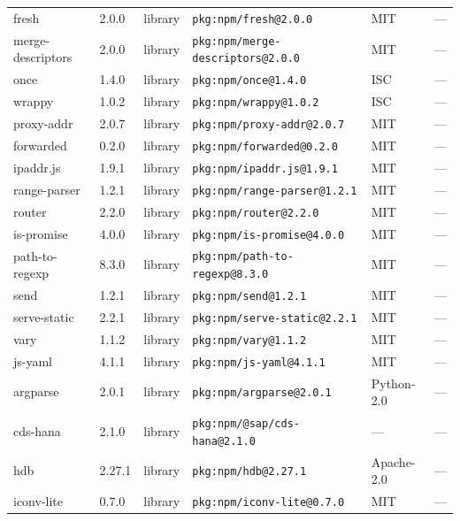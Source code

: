 \documentclass[11pt,a4paper]{article}
\begin{document}
\begin{longtable}{|p{4cm}|p{2cm}|p{1.6cm}|p{5cm}|p{1.5cm}|p{3.5cm}|}
\raggedright fresh & 2.0.0 & library & \small\texttt{pkg:npm/fresh@2.0.0} & MIT & \small — \\
\raggedright merge-descriptors & 2.0.0 & library & \small\texttt{pkg:npm/merge-descriptors@2.0.0} & MIT & \small — \\
\raggedright once & 1.4.0 & library & \small\texttt{pkg:npm/once@1.4.0} & ISC & \small — \\
\raggedright wrappy & 1.0.2 & library & \small\texttt{pkg:npm/wrappy@1.0.2} & ISC & \small — \\
\raggedright proxy-addr & 2.0.7 & library & \small\texttt{pkg:npm/proxy-addr@2.0.7} & MIT & \small — \\
\raggedright forwarded & 0.2.0 & library & \small\texttt{pkg:npm/forwarded@0.2.0} & MIT & \small — \\
\raggedright ipaddr.js & 1.9.1 & library & \small\texttt{pkg:npm/ipaddr.js@1.9.1} & MIT & \small — \\
\raggedright range-parser & 1.2.1 & library & \small\texttt{pkg:npm/range-parser@1.2.1} & MIT & \small — \\
\raggedright router & 2.2.0 & library & \small\texttt{pkg:npm/router@2.2.0} & MIT & \small — \\
\raggedright is-promise & 4.0.0 & library & \small\texttt{pkg:npm/is-promise@4.0.0} & MIT & \small — \\
\raggedright path-to-regexp & 8.3.0 & library & \small\texttt{pkg:npm/path-to-regexp@8.3.0} & MIT & \small — \\
\raggedright send & 1.2.1 & library & \small\texttt{pkg:npm/send@1.2.1} & MIT & \small — \\
\raggedright serve-static & 2.2.1 & library & \small\texttt{pkg:npm/serve-static@2.2.1} & MIT & \small — \\
\raggedright vary & 1.1.2 & library & \small\texttt{pkg:npm/vary@1.1.2} & MIT & \small — \\
\raggedright js-yaml & 4.1.1 & library & \small\texttt{pkg:npm/js-yaml@4.1.1} & MIT & \small — \\
\raggedright argparse & 2.0.1 & library & \small\texttt{pkg:npm/argparse@2.0.1} & Python-2.0 & \small — \\
\raggedright cds-hana & 2.1.0 & library & \small\texttt{pkg:npm/@sap/cds-hana@2.1.0} & — & \small — \\
\raggedright hdb & 2.27.1 & library & \small\texttt{pkg:npm/hdb@2.27.1} & Apache-2.0 & \small — \\
\raggedright iconv-lite & 0.7.0 & library & \small\texttt{pkg:npm/iconv-lite@0.7.0} & MIT & \small — \\

\end{longtable}
\end{document}

